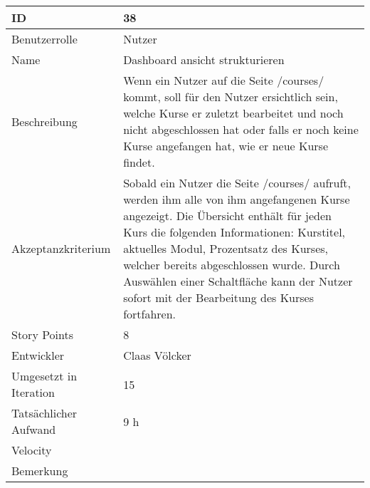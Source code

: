 \begin{tabularx}{\textwidth}{|p{}|X|}
	\hline
	ID & 38 \\
	\hline
	Benutzerrolle & Nutzer \\
	\hline
	Name & Dashboard ansicht strukturieren\\
	\hline
	Beschreibung & Wenn ein Nutzer auf die Seite /courses/ kommt, soll für den Nutzer ersichtlich sein, welche Kurse er zuletzt bearbeitet und noch nicht abgeschlossen hat oder falls er noch keine Kurse angefangen hat, wie er neue Kurse findet.  \\
	\hline
	Akzeptanzkriterium & Sobald ein Nutzer die Seite /courses/ aufruft, werden ihm alle von ihm angefangenen Kurse angezeigt. Die Übersicht enthält für jeden Kurs die folgenden Informationen: Kurstitel, aktuelles Modul, Prozentsatz des Kurses, welcher bereits abgeschlossen wurde. Durch Auswählen einer Schaltfläche kann der Nutzer sofort mit der Bearbeitung des Kurses fortfahren. \\
	\hline
	Story Points & 8\\
	\hline
	Entwickler & Claas Völcker\\
	\hline
	Umgesetzt in Iteration & 15\\
	\hline
	Tatsächlicher Aufwand & 9 h\\
	\hline
	Velocity & \\
	\hline
	Bemerkung & \\
	\hline
\end{tabularx}
\vspace{20pt}

